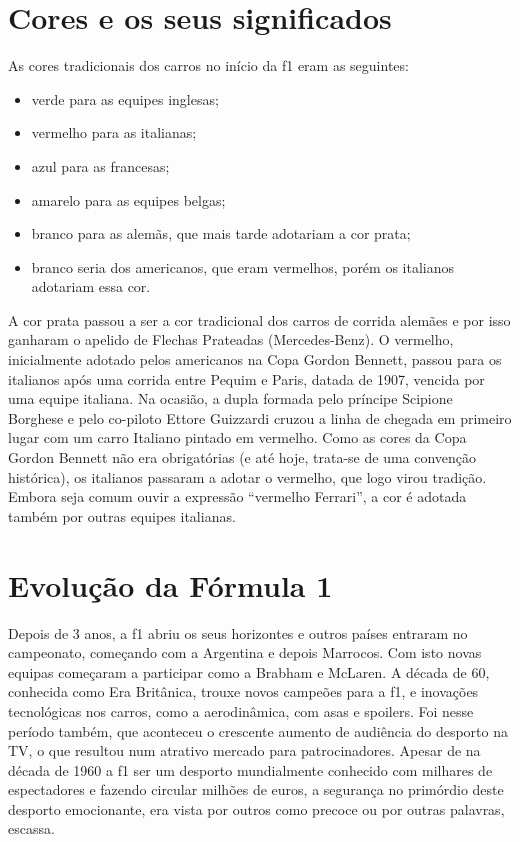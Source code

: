 \documentclass{report}
\begin{document}
\section{Cores e os seus significados} 

As cores tradicionais dos carros no início da \ac{f1} eram as seguintes:

\begin{itemize}
\item verde para as equipes inglesas;
\item vermelho para as italianas;
\item azul para as francesas;
\item amarelo para as equipes belgas;
\item branco para as alemãs, que mais tarde adotariam a cor prata;
\item branco seria dos americanos, que eram vermelhos, porém os italianos adotariam essa cor.
\end{itemize}


 A cor prata passou a ser a cor tradicional dos carros de corrida alemães e por isso ganharam o apelido de Flechas Prateadas (Mercedes-Benz).
 O vermelho, inicialmente adotado pelos americanos na Copa Gordon Bennett, passou para os italianos após uma corrida entre Pequim e Paris, datada de 1907, vencida por uma equipe italiana. Na ocasião, a dupla formada pelo príncipe Scipione Borghese e pelo co-piloto Ettore Guizzardi cruzou a linha de chegada em primeiro lugar com um carro Italiano pintado em vermelho. Como as cores da Copa Gordon Bennett não era obrigatórias (e até hoje, trata-se de uma convenção histórica), os italianos passaram a adotar o vermelho, que logo virou tradição. Embora seja comum ouvir a expressão “vermelho Ferrari”, a cor é adotada também por outras equipes italianas.\\[1cm]

\section{Evolução da Fórmula 1}

Depois de 3 anos, a \ac{f1} abriu os seus horizontes e outros países entraram no campeonato, começando com a Argentina e depois Marrocos. Com isto novas equipas começaram a participar como a Brabham e McLaren.
 A década de 60, conhecida como Era Britânica, trouxe novos campeões para a \ac{f1}, e inovações tecnológicas nos carros, como a aerodinâmica, com asas e spoilers. Foi nesse período também, que aconteceu o crescente aumento de audiência do desporto na TV, o que resultou num atrativo mercado para patrocinadores.
Apesar de na década de 1960 a \ac{f1} ser um desporto mundialmente conhecido com milhares de espectadores e fazendo circular milhões de euros, a segurança no primórdio deste desporto emocionante, era vista por outros como precoce ou por outras palavras, escassa.  
\end{document}
